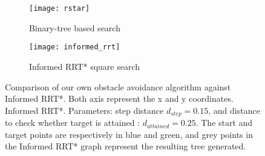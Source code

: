 \begin{figure}[h]
    \centering
    \begin{subfigure}[c][][c]{0.4\linewidth}
        \texttt{[image: rstar]}
        \caption{Binary-tree based search}
        \label{fig:own-obs-avoid}
    \end{subfigure}
    \hfill
    \begin{subfigure}[c][][c]{0.4\linewidth}
        \texttt{[image: informed\_rrt]}
        \caption{Informed RRT* square search}
        \label{fig:informed-rrt-star}
    \end{subfigure}
    \label{fig:avoidance}
    \caption{Comparison of our own obstacle avoidance algorithm against Informed RRT*. Both axis represent the x and y coordinates.
    Informed RRT*. Parameters: step distance $d_{step} = 0.15$, and distance to check whether target is attained : $d_{attained} = 0.25$.
    The start and target points are respectively in blue and green,
    and grey points in the Informed RRT* graph represent the resulting tree generated.}
\end{figure}
